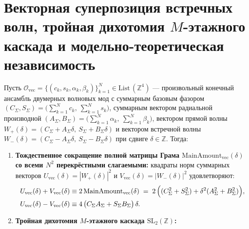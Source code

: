 \section{Векторная суперпозиция встречных волн, тройная дихотомия \texorpdfstring{$M$}{M}-этажного каскада и модельно-теоретическая независимость}

\begin{theorem}
\label{thm:math-counterwave-dichotomy-and-independence}
\leanok
Пусть $\mathcal{O}_{\mathrm{vec}} = \{(c_k, s_k, \alpha_k, \beta_k)\}_{k=1}^N \in \mathrm{List}\,(\mathbb{Z}^4)$ --- произвольный конечный ансамбль двумерных волновых мод с суммарным базовым фазором $(C_\Sigma, S_\Sigma) = \bigl(\sum_{k=1}^N c_k,\ \sum_{k=1}^N s_k\bigr)$, суммарным вектором радиальной производной $(A_\Sigma, B_\Sigma) = \bigl(\sum_{k=1}^N \alpha_k,\ \sum_{k=1}^N \beta_k\bigr)$, вектором прямой волны $W_+(\delta) = (C_\Sigma + A_\Sigma\delta,\ S_\Sigma + B_\Sigma\delta)$ и вектором встречной волны $W_-(\delta) = (C_\Sigma - A_\Sigma\delta,\ S_\Sigma - B_\Sigma\delta)$ при сдвиге $\delta \in \mathbb{Z}$. Тогда:
\begin{enumerate}[label=\textbf{(\arabic*)},leftmargin=*]
\item \textbf{Тождественное сокращение полной матрицы Грама $\mathrm{MainAmount}_{\mathrm{vec}}(\delta)$ со всеми $N^2$ перекрёстными слагаемыми:}
  квадраты норм суммарных векторов $U_{\mathrm{vec}}(\delta) = |W_+(\delta)|^2$ и $V_{\mathrm{vec}}(\delta) = |W_-(\delta)|^2$ удовлетворяют:
  \begin{align}
    U_{\mathrm{vec}}(\delta) + V_{\mathrm{vec}}(\delta) &\equiv 2\,\mathrm{MainAmount}_{\mathrm{vec}}(\delta)
      \;=\; 2\,\Bigl((C_\Sigma^2 + S_\Sigma^2) + \delta^2(A_\Sigma^2 + B_\Sigma^2)\Bigr), \label{eq:math-vec-ocean-sum} \\
    U_{\mathrm{vec}}(\delta) - V_{\mathrm{vec}}(\delta) &\equiv 4\,\bigl(C_\Sigma A_\Sigma + S_\Sigma B_\Sigma\bigr)\,\delta. \label{eq:math-vec-ocean-diff}
  \end{align}
\item \textbf{Тройная дихотомия $M$-этажного каскада $\mathrm{SL}_2(\mathbb{Z})$:}

\end{enumerate}
\end{theorem}
